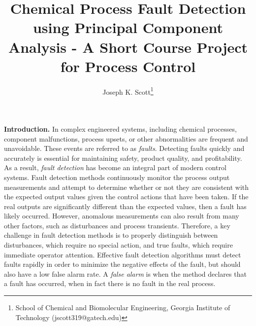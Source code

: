 \documentclass[14pt]{article}
\theoremstyle{definition}
\newcommand{\0}{\ensuremath{\mathbf{0}}}
\begin{document}
\Large
\pagestyle{fancy}
\lfoot{}
\rfoot{}
\cfoot{\Large\thepage}
\renewcommand{\headrulewidth}{0pt}
\renewcommand{\footrulewidth}{0pt}

%
%


\newpage
\title{Chemical Process Fault Detection using Principal Component Analysis - A Short Course Project for Process Control}
\author{Joseph K. Scott\footnote{School of Chemical and Biomolecular Engineering, Georgia Institute of Technology (jscott319@gatech.edu)}}
\maketitle

\noindent
{\bfseries Introduction.} In complex engineered systems, including chemical processes, component malfunctions, process upsets, or other abnormalities are frequent and unavoidable. These events are referred to as \emph{faults}. Detecting faults quickly and accurately is essential for maintaining safety, product quality, and profitability. As a result, \emph{fault detection} has become an integral part of modern control systems. Fault detection methods continuously monitor the process output measurements and attempt to determine whether or not they are consistent with the expected output values given the control actions that have been taken. If the real outputs are significantly different than the expected values, then a fault has likely occurred. However, anomalous measurements can also result from many other factors, such as disturbances and process transients. Therefore, a key challenge in fault detection methods is to properly distinguish between disturbances, which require no special action, and true faults, which require immediate operator attention. Effective fault detection algorithms must detect faults rapidly in order to minimize the negative effects of the fault, but should also have a low false alarm rate. A \emph{false alarm} is when the method declares that a fault has occurred, when in fact there is no fault in the real process. 
\end{document}
